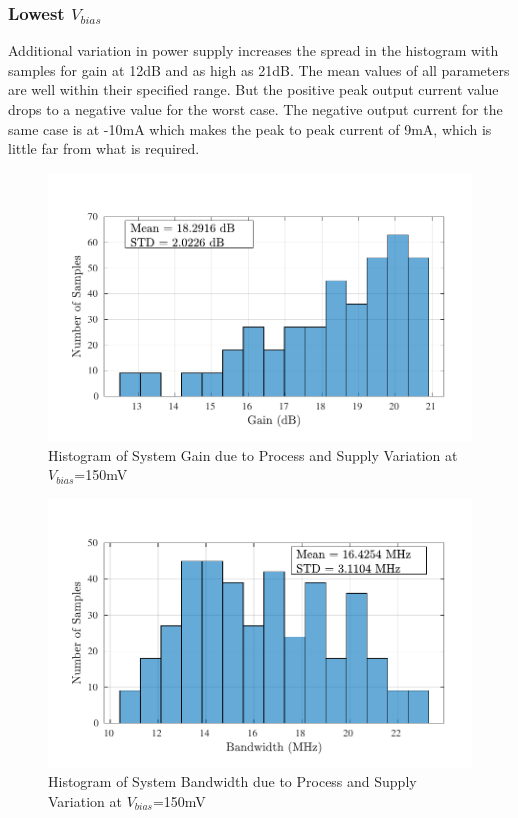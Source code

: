 \subsubsection{Lowest $V_{bias}$}
Additional variation in power supply increases the spread in the histogram with samples for gain at 12dB and as high as 21dB. The mean values of all parameters are well within their specified range. But the positive peak output current value drops to a negative value for the worst case. The negative output current for the same case is at -10mA which makes the peak to peak current of 9mA, which is little far from what is required.

\begin{figure} [H]
\centering
\includegraphics[scale=1]{Figures/Corners/Overall/PV_Min/PDFs/PV_Min_gain.pdf}
\caption{Histogram of System Gain due to Process and Supply Variation at $V_{bias}$=150mV}
\end{figure}

\begin{figure} [H]
\centering
\includegraphics[scale=1]{Figures/Corners/Overall/PV_Min/PDFs/PV_Min_bw.pdf}
\caption{Histogram of System Bandwidth due to Process and Supply Variation at $V_{bias}$=150mV}
\end{figure}

